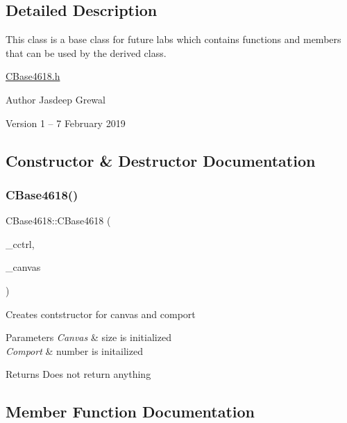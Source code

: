 \subsection{Detailed Description}
This class is a base class for future labs which contains functions and members that can be used by the derived class. 

\hyperlink{_c_base4618_8h_source}{C\+Base4618.\+h}

\begin{DoxyAuthor}{Author}
Jasdeep Grewal
\end{DoxyAuthor}
\begin{DoxyVersion}{Version}
1 -- 7 February 2019 
\end{DoxyVersion}


\subsection{Constructor \& Destructor Documentation}
\hypertarget{class_c_base4618_a43202fe8782b8620c889b3d935759cdd}{}\label{class_c_base4618_a43202fe8782b8620c889b3d935759cdd} 
\subsubsection{\texorpdfstring{C\+Base4618()}{CBase4618()}}
{\footnotesize\ttfamily C\+Base4618\+::\+C\+Base4618 (\begin{DoxyParamCaption}\item[{\hyperlink{class_c_control}{C\+Control}}]{\+\_\+cctrl,  }\item[{cv\+::\+Mat}]{\+\_\+canvas }\end{DoxyParamCaption})}

Creates contstructor for canvas and comport


\begin{DoxyParams}{Parameters}
{\em Canvas} & size is initialized \\
\hline
{\em Comport} & number is initailized\\
\hline
\end{DoxyParams}
\begin{DoxyReturn}{Returns}
Does not return anything 
\end{DoxyReturn}


\subsection{Member Function Documentation}
\hypertarget{class_c_base4618_aa4e8190003db02c98e7e6bdcfdf0ee1a}{}\label{class_c_base4618_aa4e8190003db02c98e7e6bdcfdf0ee1a} 
